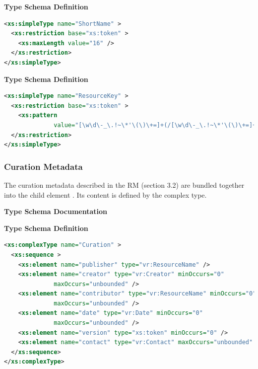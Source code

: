 \documentclass[11pt,a4paper]{ivoa}
\begin{document}
\vspace{1ex}\noindent\textbf{ Type Schema Definition}

\begin{lstlisting}[language=XML,basicstyle=\footnotesize]
<xs:simpleType name="ShortName" >
  <xs:restriction base="xs:token" >
    <xs:maxLength value="16" />
  </xs:restriction>
</xs:simpleType>
\end{lstlisting}\endgroup

\begingroup
      	\renewcommand*\descriptionlabel[1]{%
      	\hbox to 5.5em{\emph{#1}\hfil}}\vspace{1ex}\noindent\textbf{ Type Schema Definition}

\begin{lstlisting}[language=XML,basicstyle=\footnotesize]
<xs:simpleType name="ResourceKey" >
  <xs:restriction base="xs:token" >
    <xs:pattern
              value="[\w\d\-_\.!~\*'\(\)\+=]+(/[\w\d\-_\.!~\*'\(\)\+=]+)*" />
  </xs:restriction>
</xs:simpleType>
\end{lstlisting}\endgroup



\subsubsection{Curation Metadata}


The curation metadata described in the RM (section
3.2) are bundled together into the  child element
.  Its content is defined by the
 complex type.



\begingroup
      	\renewcommand*\descriptionlabel[1]{%
      	\hbox to 5.5em{\emph{#1}\hfil}}\vspace{2ex}\noindent\textbf{ Type Schema Documentation}


\vspace{1ex}\noindent\textbf{ Type Schema Definition}

\begin{lstlisting}[language=XML,basicstyle=\footnotesize]
<xs:complexType name="Curation" >
  <xs:sequence >
    <xs:element name="publisher" type="vr:ResourceName" />
    <xs:element name="creator" type="vr:Creator" minOccurs="0"
              maxOccurs="unbounded" />
    <xs:element name="contributor" type="vr:ResourceName" minOccurs="0"
              maxOccurs="unbounded" />
    <xs:element name="date" type="vr:Date" minOccurs="0"
              maxOccurs="unbounded" />
    <xs:element name="version" type="xs:token" minOccurs="0" />
    <xs:element name="contact" type="vr:Contact" maxOccurs="unbounded" />
  </xs:sequence>
</xs:complexType>
\end{lstlisting}
\end{document}
